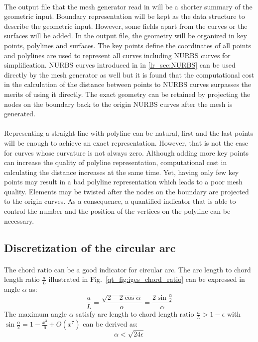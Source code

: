 \paragraph{}
The output file that the mesh generator read in will be a shorter summary of the geometric input.
Boundary representation will be kept as the data structure to describe the geometric input.
However, some fields apart from the curves or the surfaces will be added.
In the output file, the geometry will be organized in key points, polylines and surfaces.
The key points define the coordinates of all points and polylines are used to represent all curves including NURBS curves for simplification.
NURBS curves introduced in in \ref{lr_sec:NURBS} can be used directly by the mesh generator as well but it is found that the computational cost in the calculation of the distance between points to NURBS curves surpasses the merits of using it directly.
The exact geometry can be retained by projecting the nodes on the boundary back to the origin NURBS curves after the mesh is generated.

\paragraph{}
Representing a straight line with polyline can be natural, first and the last points will be enough to achieve an exact representation.
However, that is not the case for curves whose curvature is not always zero.
Although adding more key points can increase the quality of polyline representation, computational cost in calculating the distance increases at the same time.
Yet, having only few key points may result in a bad polyline representation which leads to a poor mesh quality.
Elements may be twisted after the nodes on the boundary are projected to the origin curves.
As a consequence, a quantified indicator that is able to control the number and the position of the vertices on the polyline can be necessary.

\subsection{Discretization of the circular arc}
\paragraph{}
The chord ratio can be a good indicator for circular arc.
The arc length to chord length ratio $\frac{a}{L}$ illustrated in Fig.~\ref{qt_fig:iges_chord_ratio} can be expressed in angle $\alpha$ as:
    \begin{equation}
        \frac{a}{L} = \frac{
            \sqrt{2-2\cos\alpha}
        }{\alpha}
        = \frac{
            2\sin\frac{\alpha}{2}
        }{\alpha}
    \end{equation}
%
The maximum angle $\alpha$ satisfy arc length to chord length ratio $\frac{a}{L} > 1-\epsilon$ with $
    \sin\frac{\alpha}{2} = 1 - \frac{x^3}{6} + O(x^7)
$ can be derived as:
    \begin{equation}
        \alpha < \sqrt{24 \epsilon}
    \end{equation}


